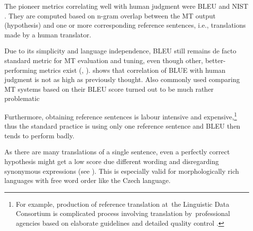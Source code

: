 The pioneer metrics correlating well with human judgment were BLEU \cite{bleu} 
and NIST \citep{nist}. They are computed based on n-gram overlap between the 
MT output (hypothesis) and one or more corresponding reference sentences, i.e., 
translations made by a human translator.

Due to its simplicity and language independence, BLEU still remains de facto
standard metric for MT evaluation and tuning, even though other, 
better-performing metrics exist (\cite{wmt13-metrics}, \cite{wmt14}). 
\cite{callison2006re} shows that correlation of BLUE with human judgment is 
not as high as previously thought. Also commonly used comparing MT systems
based on their BLEU score turned out to be much rather problematic \cite{tenMattPost}


Furthermore, obtaining reference sentences is labour intensive and 
expensive,\footnote{For example, production of reference translation  at~the 
Linguistic Data Consortium is complicated process involving translation 
by~professional agencies based on elaborate guidelines and detailed quality 
control \cite{strassel}.} thus the standard practice is using only one 
reference sentence and BLEU then tends to perform badly. 

As there are many translations of a single sentence, even a perfectly correct 
hypothesis might get a low score due different wording and disregarding 
synonymous expressions (see ). This is 
especially valid for morphologically rich languages with free word order 
like the Czech language. \cite{bojar-tackling-sparse-data}


